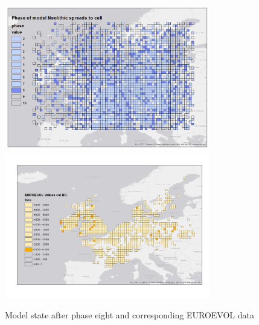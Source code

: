 \begin{figure}
\centering
	\includegraphics[width=0.8\textwidth]{figures/model-8}
	\includegraphics[width=0.8\textwidth]{figures/euroevol-8}
  \caption{Model state after phase eight and corresponding EUROEVOL data}
  \label{fig:compare8}
\end{figure}

